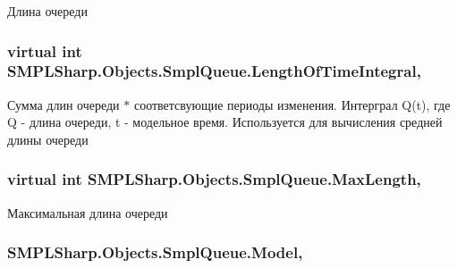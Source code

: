 Длина очереди 

\hypertarget{class_s_m_p_l_sharp_1_1_objects_1_1_smpl_queue_a157275049efc507053a44cbd72d7ba2f}{
\subsubsection[{Length\-Of\-Time\-Integral}]{\setlength{\rightskip}{0pt plus 5cm}virtual int S\-M\-P\-L\-Sharp.\-Objects.\-Smpl\-Queue.\-Length\-Of\-Time\-Integral\hspace{0.3cm}{\ttfamily [get]}, {\ttfamily [set]}}}\label{d3/ded/class_s_m_p_l_sharp_1_1_objects_1_1_smpl_queue_a157275049efc507053a44cbd72d7ba2f}


Сумма длин очереди $\ast$ соответсвующие периоды изменения. Интерграл Q(t), где Q -\/ длина очереди, t -\/ модельное время. Используется для вычисления средней длины очереди 

\hypertarget{class_s_m_p_l_sharp_1_1_objects_1_1_smpl_queue_ac807329d1f3d17f6e651fc20ad50c06c}{
\subsubsection[{Max\-Length}]{\setlength{\rightskip}{0pt plus 5cm}virtual int S\-M\-P\-L\-Sharp.\-Objects.\-Smpl\-Queue.\-Max\-Length\hspace{0.3cm}{\ttfamily [get]}, {\ttfamily [set]}}}\label{d3/ded/class_s_m_p_l_sharp_1_1_objects_1_1_smpl_queue_ac807329d1f3d17f6e651fc20ad50c06c}


Максимальная длина очереди 

\hypertarget{class_s_m_p_l_sharp_1_1_objects_1_1_smpl_queue_a4fd05b0b855d569bd43a71c738b9bb7f}{
\subsubsection[{Model}]{ S\-M\-P\-L\-Sharp.\-Objects.\-Smpl\-Queue.\-Model\hspace{0.3cm}{\ttfamily [get]}, {\ttfamily [set]}}}\label{d3/ded/class_s_m_p_l_sharp_1_1_objects_1_1_smpl_queue_a4fd05b0b855d569bd43a71c738b9bb7f}


